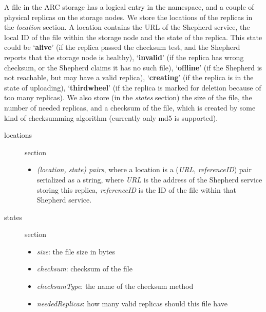 \documentclass{book}
\begin{document}
A file in the ARC storage has a logical entry in the namespace, and a couple of physical replicas on the storage nodes. We store the locations of the replicas in the \emph{location} section. A location contains the URL of the Shepherd service, the local ID of the file within the storage node and the state of the replica. This state could be `\textbf{alive}' (if the replica passed the checksum test, and the Shepherd reports that the storage node is healthy), `\textbf{invalid}' (if the replica has wrong checksum, or the Shepherd claims it has no such file), `\textbf{offline}' (if the Shepherd is not reachable, but may have a valid replica), `\textbf{creating}' (if the replica is in the state of uploading), `\textbf{thirdwheel}' (if the replica is marked for deletion because of too many replicas). We also store (in the \emph{states} section) the size of the file, the number of needed replicas, and a checksum of the file, which is created by some kind of checksumming algorithm (currently only md5 is supported).

\begin{description}
    \item [locations] section 
    \begin{itemize}
        \item \emph{(location, state) pairs}, where a location is a (\emph{URL}, \emph{referenceID}) pair serialized as a string, where \emph{URL} is the address of the Shepherd service storing this replica, \emph{referenceID} is the ID of the file within that Shepherd service.
    \end{itemize}
    \item [states] section 
    \begin{itemize}
        \item \emph{size}: the file size in bytes
        \item \emph{checksum}: checksum of the file
        \item \emph{checksumType}: the name of the checksum method
        \item \emph{neededReplicas}: how many valid replicas should this file have 
    \end{itemize}
\end{description}




\end{document}
